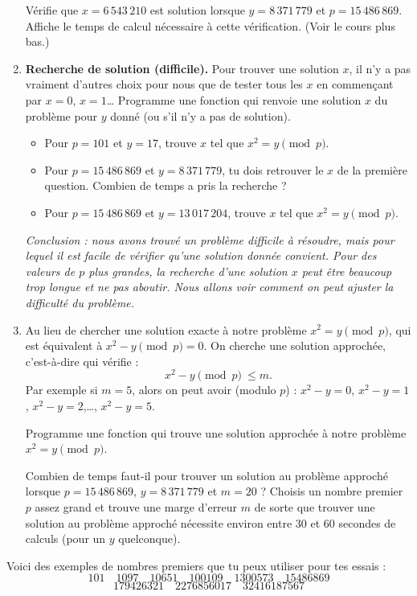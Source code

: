 \documentclass[11pt,class=report,crop=false]{standalone}
\begin{document}
\begin{activite}
\begin{enumerate}
  Vérifie que $x = 6\,543\,210$ est solution lorsque $y = 8\,371\,779$ et $p = 15\,486\,869$. Affiche le temps de calcul nécessaire à cette vérification. (Voir le cours plus bas.)
  
  \item \textbf{Recherche de solution (difficile).} Pour trouver une solution $x$, il n'y a pas vraiment d'autres choix pour nous que de tester tous les $x$ en commençant par $x=0$, $x=1$\ldots{}
Programme une fonction  qui renvoie une solution $x$ du problème pour $y$ donné (ou  s'il n'y a pas de solution).

  \begin{itemize}
    \item Pour $p = 101$ et $y=17$, trouve $x$ tel que $x^2 = y \pmod{p}$. 
    \item Pour $p = 15\,486\,869$ et $y = 8\,371\,779$, tu dois retrouver le $x$ de la première question. Combien de temps a pris la recherche ? 
    
    \item Pour $p = 15\,486\,869$ et $y = 13\,017\,204$, trouve $x$ tel que $x^2 = y \pmod{p}$.    
   \end{itemize}


\medskip

\emph{Conclusion : nous avons trouvé un problème difficile à résoudre, mais pour lequel il est facile de vérifier qu'une solution donnée convient. Pour des valeurs de $p$ plus grandes, la recherche d'une solution $x$ peut être beaucoup trop longue et ne pas aboutir. Nous allons voir comment on peut ajuster la difficulté du problème.}


	\item Au lieu de chercher une solution exacte à notre problème $x^2 = y \pmod{p}$, qui est équivalent à $x^2-y \pmod{p} = 0$. On cherche une solution approchée, c'est-à-dire qui vérifie : 	$$x^2 - y \pmod{p} \ \le m.$$
	Par exemple si $m=5$, alors on peut avoir (modulo $p$) : $x^2 - y = 0$, $x^2 - y = 1$,
	$x^2-y = 2$,\ldots, $x^2-y=5$. 
	
	Programme une fonction  qui trouve une solution approchée à notre problème $x^2 = y \pmod{p}$.
	
	Combien de temps faut-il pour trouver un solution au problème approché lorsque $p = 15\,486\,869$,  $y = 8\,371\,779$ et $m=20$ ?
	Choisis un nombre premier $p$ assez grand et trouve une marge d'erreur $m$ de sorte que trouver une solution au problème approché nécessite environ entre 30 et 60 secondes de calculs (pour un $y$ quelconque).

\end{enumerate}
  

Voici des exemples de nombres premiers que tu peux utiliser pour tes essais :
$$101 \quad
1097 \quad
10651 \quad
100109 \quad
1300573 \quad
15486869$$
$$179426321 \quad  
2276856017 \quad 
32416187567$$
\end{activite}
\end{document}
